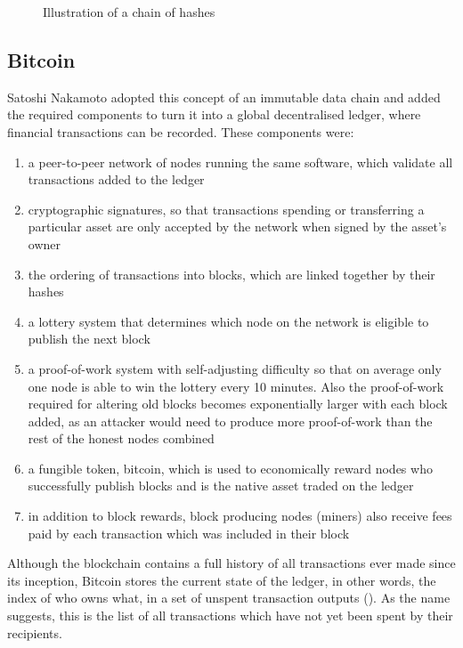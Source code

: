 \begin{figure}[h]
    \centering
    \captionsetup{justification=centering}
    
    \caption[Illustration of a chain of hashes]{Illustration of a chain of hashes}
    \label{fig:hashing}
\end{figure}


\subsection{Bitcoin}

Satoshi Nakamoto \cite{nakamotoBitcoinPeertopeerElectronic2008a}  adopted this concept of an immutable data chain and added the required components to turn it into a global decentralised ledger, where financial transactions can be recorded. These components were:

\begin{enumerate}
    \item a peer-to-peer network of nodes running the same software, which validate all transactions added to the ledger 
    \item cryptographic signatures, so that transactions spending or transferring a particular asset are only accepted by the network when signed by the asset's owner
    \item the ordering of transactions into blocks, which are linked together by their hashes
    \item a lottery system that determines which node on the network is eligible to publish the next block
    \item a proof-of-work system with self-adjusting difficulty so that on average only one node is able to win the lottery every 10 minutes. Also the proof-of-work required for altering old blocks becomes exponentially larger with each block added, as an attacker would need to produce more proof-of-work than the rest of the honest nodes combined
    \item a fungible token, bitcoin, which is used to economically reward nodes who successfully publish blocks and is the native asset traded on the ledger
    \item in addition to block rewards, block producing nodes (miners) also receive fees paid by each transaction which was included in their block
\end{enumerate}

\vspace{0.5cm}

Although the blockchain contains a full history of all transactions ever made since its inception, Bitcoin stores the current state of the ledger, in other words, the index of who owns what, in a set of unspent transaction outputs (). As the name suggests, this is the list of all transactions which have not yet been spent by their recipients.

